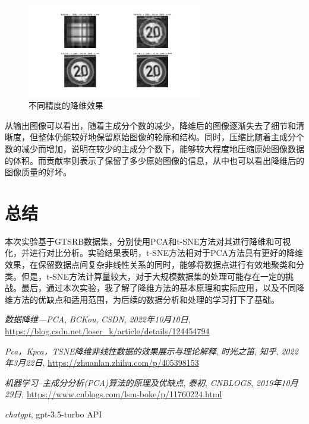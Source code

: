 \documentclass[lettersize,journal]{IEEEtran}
\begin{document}
\begin{figure}[H]
\centering
\includegraphics[width=3in]{image/Figure_6.png}
\caption{不同精度的降维效果}
\end{figure}

从输出图像可以看出，随着主成分个数的减少，降维后的图像逐渐失去了细节和清晰度，但整体仍能较好地保留原始图像的轮廓和结构。同时，压缩比随着主成分个数的减少而增加，说明在较少的主成分个数下，能够较大程度地压缩原始图像数据的体积。而贡献率则表示了保留了多少原始图像的信息，从中也可以看出降维后的图像质量的好坏。

\section{总结}

本次实验基于GTSRB数据集，分别使用PCA和t-SNE方法对其进行降维和可视化，并进行对比分析。实验结果表明，t-SNE方法相对于PCA方法具有更好的降维效果，在保留数据点间复杂非线性关系的同时，能够将数据点进行有效地聚类和分类。但是，t-SNE方法计算量较大，对于大规模数据集的处理可能存在一定的挑战。最后，通过本次实验，我了解了降维方法的基本原理和实际应用，以及不同降维方法的优缺点和适用范围，为后续的数据分析和处理的学习打下了基础。

\begin{thebibliography}{1}

{\it{数据降维—PCA}}, {\it{BCKou}}, {\it{CSDN}}, {\it{2022年10月10日}}, \url{https://blog.csdn.net/loser_k/article/details/124454794}

{\it{Pca，Kpca，TSNE降维非线性数据的效果展示与理论解释}}, {\it{时光之笛}}, {\it{知乎}}, {\it{2022年3月22日}}, \url{https://zhuanlan.zhihu.com/p/405398153}

{\it{机器学习--主成分分析(PCA)算法的原理及优缺点}}, {\it{泰初}}, {\it{CNBLOGS}}, {\it{2019年10月29日}}, \url{https://www.cnblogs.com/lsm-boke/p/11760224.html}

{\it{chatgpt}}, gpt-3.5-turbo API

\end{thebibliography}
\end{document}
